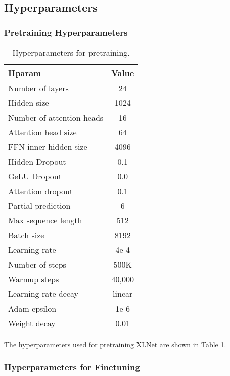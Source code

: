 \documentclass{article}
\begin{document}
\subsection{Hyperparameters} \label{sec:hp}

\subsubsection{Pretraining Hyperparameters}

\begin{table}[h!]
  \small
  \centering
  
  \begin{tabular}{lc}
    \toprule
    \bf Hparam & \bf Value \\
    \midrule
    Number of layers & 24 \\
    Hidden size & 1024 \\
    Number of attention heads & 16 \\
    Attention head size & 64 \\
    FFN inner hidden size & 4096 \\
    Hidden Dropout & 0.1 \\
    GeLU Dropout & 0.0 \\
    Attention dropout & 0.1 \\
    Partial prediction  & 6 \\
    Max sequence length & 512 \\
    Batch size & 8192 \\
    Learning rate & 4e-4 \\
    Number of steps & 500K \\
    Warmup steps & 40,000 \\
    Learning rate decay & linear \\
    Adam epsilon  & 1e-6 \\
    Weight decay & 0.01 \\
    \bottomrule
  \end{tabular}
  \caption{\small
    Hyperparameters for pretraining.
  }
  \label{tab:hp-pretrain}
  \vspace{-1em}
\end{table}

The hyperparameters used for pretraining XLNet are shown in Table \ref{tab:hp-pretrain}.

\subsubsection{Hyperparameters for Finetuning}
\end{document}
